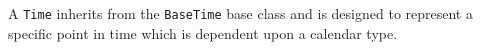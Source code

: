 
A {\tt Time} inherits from the {\tt BaseTime} base class and is designed
to represent a specific point in time which is dependent upon a calendar
type.

